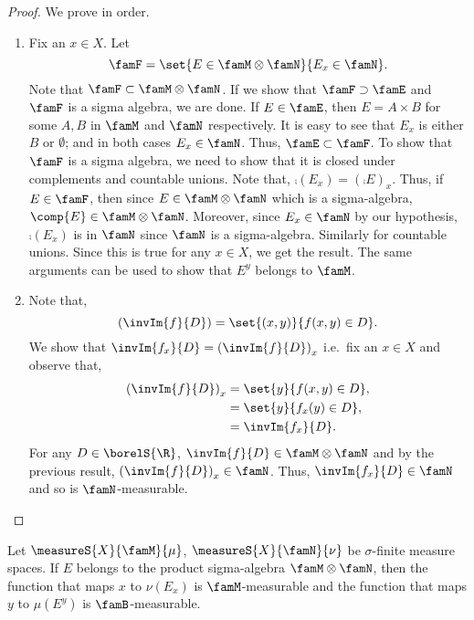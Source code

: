 \begin{proof}
    We prove in order.
    \begin{enumerate}
	\item
	    Fix an $x \in X$.
	    Let \[\famF = \set{E\in\famM\otimes\famN}{E_x \in \famN}.\]
	    Note that $\famF \subset \famM\otimes\famN$. If we show that $\famF \supset \famE$ and $\famF$ is
	    a sigma algebra, we are done.
	    If $E \in \famE$, then $E = A \times B$ for some $A,B$ in $\famM$ and $\famN$ respectively. It is
	    easy to see that $E_x$ is either $B$ or $\emptyset$; and in both cases $E_x \in \famN$. Thus,
	    $\famE \subset \famF$. To show that $\famF$ is a sigma algebra, we need to show that it is closed
	    under complements and countable unions. Note that,
	    $\comp{(E_x)} = {(\comp{E})}_{x}$. Thus, if $E \in \famF$, then since $E \in \famM\otimes\famN$
	    which is a sigma-algebra, $\comp{E} \in \famM\otimes\famN$. Moreover, since $E_x \in \famN$ by
	    our hypothesis, $\comp{(E_x)}$ is in $\famN$ since $\famN$ is a sigma-algebra. Similarly for
	    countable unions. Since this is true for any $x \in X$, we get the result. The same arguments can
	    be used to show that $E^{y}$ belongs to $\famM$.
	\item
	    Note that,
	    \[{(\invIm{f}{D})} = \set{(x,y)}{f(x,y)\in D}.\]
	    We show that $\invIm{f_x}{D} = {(\invIm{f}{D})}_{x}$ i.e.~fix an $x \in X$ and
	    observe that,
	    \begin{equation*}
		\begin{aligned}
		    {(\invIm{f}{D})}_{x} &= \set{y}{f(x,y)\in D},\\
		    &= \set{y}{f_x(y) \in D},\\
		    &= \invIm{f_x}{D}.
		\end{aligned}
	    \end{equation*}
	    For any $D \in \borelS{\R}$, $\invIm{f}{D} \in \famM\otimes\famN$ and by the previous result,
	    ${(\invIm{f}{D})}_{x} \in \famN$. Thus, $\invIm{f_x}{D} \in \famN$ and so is $\famN$-measurable.
    \end{enumerate}
\end{proof}
\begin{Proposition}
    Let $\measureS{X}{\famM}{\mu}$, $\measureS{X}{\famN}{\nu}$ be $\sigma$-finite measure spaces. If $E$
    belongs to the product sigma-algebra $\famM\otimes\famN$, then the function that maps $x$ to $\nu(E_x)$
    is $\famM$-measurable and the function that maps $y$ to $\mu(E^{y})$ is $\famB$-measurable.
\end{Proposition}

